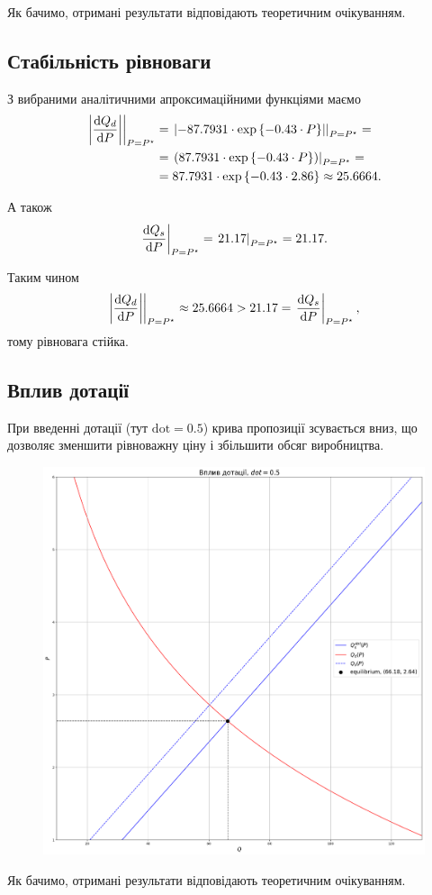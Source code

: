 Як бачимо, отримані результати відповідають теоретичним очікуванням.

\subsection{Стабільність рівноваги}

З вибраними аналітичними апроксимаційними функціями маємо 
\begin{align*} 
	\left. \left| \dfrac{\mathop{}\!\mathrm{d} Q_d}{\mathop{}\!\mathrm{d} P} \right| \right|_{P = P^\star} &= \left. \left| -87.7931 \cdot \exp\left\{-0.43 \cdot P\right\} \right| \right|_{P = P^\star} = \\ 
	&= \left. \left( 87.7931 \cdot \exp\left\{-0.43 \cdot P\right\} \right) \right|_{P = P^\star} = \\ 
	&= 87.7931 \cdot \exp\left\{-0.43 \cdot 2.86\right\} \approx 25.6664.
\end{align*}

А також \[ \left. \dfrac{\mathop{}\!\mathrm{d} Q_s}{\mathop{}\!\mathrm{d} P} \right|_{P = P^\star} = \left. 21.17 \right|_{P = P^\star} = 21.17. \]

Таким чином \[ \left. \left| \dfrac{\mathop{}\!\mathrm{d} Q_d}{\mathop{}\!\mathrm{d} P} \right| \right|_{P = P^\star} \approx 25.6664 > 21.17 = \left. \dfrac{\mathop{}\!\mathrm{d} Q_s}{\mathop{}\!\mathrm{d} P} \right|_{P = P^\star}, \] тому рівновага стійка.

\subsection{Вплив дотації}

При введенні дотації (тут $\text{dot} = 0.5$) крива пропозиції зсувається вниз, що дозволяє зменшити рівноважну ціну і збільшити обсяг виробництва.

\begin{figure}[H]
	\centering
	\includegraphics[width=\textwidth]{dotation.png}
\end{figure}

Як бачимо, отримані результати відповідають теоретичним очікуванням.

